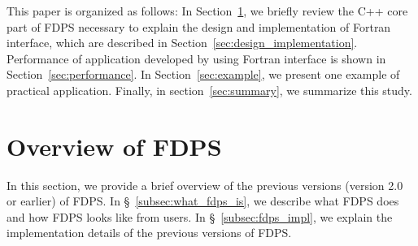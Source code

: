 \documentclass[proof,useamsfonts]{pasj01}
\begin{document}
This paper is organized as follows: In Section~\ref{sec:overview_of_fdps}, we briefly review the C++ core part of FDPS necessary to explain the design and implementation of Fortran interface, which are described in Section~\ref{sec:design_implementation}. Performance of application developed by using Fortran interface is shown in Section~\ref{sec:performance}. In Section~\ref{sec:example}, we present one example of practical application.  Finally, in section~\ref{sec:summary}, we summarize this study.


\section{Overview of FDPS}
\label{sec:overview_of_fdps}
In this section, we provide a brief overview of the previous versions (version 2.0 or earlier) of FDPS. In \S~\ref{subsec:what_fdps_is}, we describe what FDPS does and how FDPS looks like from users. In \S~\ref{subsec:fdps_impl}, we explain the implementation details of the previous versions of FDPS. 

\end{document}
